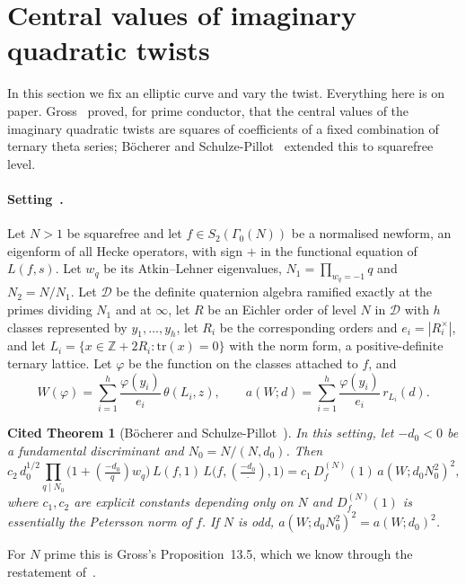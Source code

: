 \documentclass[10pt]{amsart}
\theoremstyle{plain}
\newtheorem{citedtheorem}[theorem]{Cited Theorem}
\theoremstyle{definition}
\theoremstyle{remark}
\numberwithin{equation}{section}
\newcommand{\Z}{\mathbb{Z}}
\begin{document}
\section{Central values of imaginary quadratic twists}\label{sec:twists}

In this section we fix an elliptic curve and vary the twist. Everything here is on paper. Gross~\cite{Gro87}
proved, for prime conductor, that the central values of the imaginary quadratic twists are squares of
coefficients of a fixed combination of ternary theta series; B\"ocherer and Schulze-Pillot~\cite{BSP90}
extended this to squarefree level.

\paragraph{Setting~\cite[\S1.4, \S3]{BSP90}.} Let $N>1$ be squarefree and let $f\in S_2(\Gamma_0(N))$ be a
normalised newform, an eigenform of all Hecke operators, with sign $+$ in the functional equation of
$L(f,s)$. Let $w_q$ be its Atkin--Lehner eigenvalues, $N_1=\prod_{w_q=-1}q$ and $N_2=N/N_1$. Let $\mathcal D$ be
the definite quaternion algebra ramified exactly at the primes dividing $N_1$ and at $\infty$, let $R$ be an
Eichler order of level $N$ in $\mathcal D$ with $h$ classes represented by $y_1,\dots,y_h$, let $R_i$ be the
corresponding orders and $e_i=|R_i^\times|$, and let $L_i=\{x\in\Z+2R_i:\mathrm{tr}(x)=0\}$ with the norm form, a
positive-definite ternary lattice. Let $\varphi$ be the function on the classes attached to $f$, and
\[
  W(\varphi)=\sum_{i=1}^h\frac{\varphi(y_i)}{e_i}\,\theta(L_i,z),\qquad
  a(W;d)=\sum_{i=1}^h\frac{\varphi(y_i)}{e_i}\,r_{L_i}(d).
\]

\begin{citedtheorem}[{B\"ocherer and Schulze-Pillot~\cite[\S3, (3.5)]{BSP90}}]\label{cit:bsp}
In this setting, let $-d_0<0$ be a fundamental discriminant and $N_0=N/(N,d_0)$. Then
\[
  c_2\,d_0^{1/2}\prod_{q\mid N_0}\bigl(1+(\tfrac{-d_0}{q})w_q\bigr)\,L(f,1)\,L\bigl(f,(\tfrac{-d_0}{\cdot}),1\bigr)
  =c_1\,D_f^{(N)}(1)\,a(W;d_0N_0^2)^2,
\]
where $c_1,c_2$ are explicit constants depending only on $N$ and $D_f^{(N)}(1)$ is essentially the Petersson
norm of $f$. If $N$ is odd, $a(W;d_0N_0^2)^2=a(W;d_0)^2$.
\end{citedtheorem}

\noindent For $N$ prime this is Gross's Proposition~13.5, which we know through the restatement
of~\cite[(3.1)]{MRVT07}.
\end{document}
